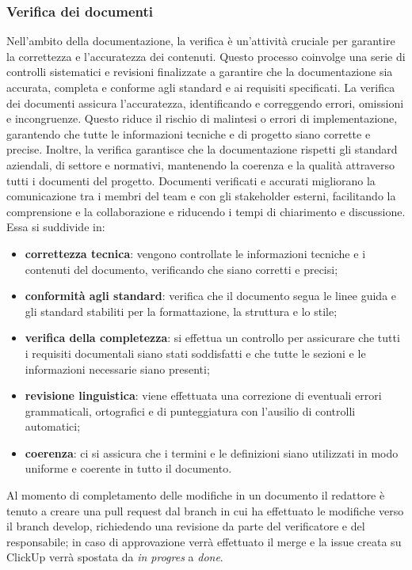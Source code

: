 \subsubsection{Verifica dei documenti} \label{verifica_dei_documenti}
Nell'ambito della documentazione, la verifica è un'attività cruciale per garantire la correttezza e l'accuratezza dei contenuti. Questo processo coinvolge una serie di controlli sistematici e revisioni finalizzate a garantire che la documentazione sia accurata, completa e conforme agli standard e ai requisiti specificati.
La verifica dei documenti assicura l'accuratezza, identificando e correggendo errori, omissioni e incongruenze. Questo riduce il rischio di malintesi o errori di implementazione, garantendo che tutte le informazioni tecniche e di progetto siano corrette e precise.
Inoltre, la verifica garantisce che la documentazione rispetti gli standard aziendali, di settore e normativi, mantenendo la coerenza e la qualità attraverso tutti i documenti del progetto. Documenti verificati e accurati migliorano la comunicazione tra i membri del team e con gli stakeholder esterni, facilitando la comprensione e la collaborazione e riducendo i tempi di chiarimento e discussione. Essa si suddivide in:
\begin{itemize}
	\item \textbf{correttezza tecnica}: vengono controllate le informazioni tecniche e i contenuti del documento, verificando che siano corretti e precisi;
	\item \textbf{conformità agli standard}: verifica che il documento segua le linee guida e gli standard stabiliti per la formattazione, la struttura e lo stile;
	\item \textbf{verifica della completezza}: si effettua un controllo per assicurare che tutti i requisiti documentali siano stati soddisfatti e che  tutte le sezioni e le informazioni necessarie siano presenti;
	\item \textbf{revisione linguistica}: viene effettuata una correzione di eventuali errori grammaticali, ortografici e di punteggiatura con l'ausilio di controlli automatici;
	\item \textbf{coerenza}: ci si assicura che i termini e le definizioni siano utilizzati in modo uniforme e coerente in tutto il documento.
\end{itemize}

Al momento di completamento delle modifiche in un documento il redattore è tenuto a creare una pull request dal branch in cui ha effettuato le modifiche verso il branch develop, richiedendo una revisione da parte del verificatore e del responsabile; in caso di approvazione verrà effettuato il merge e la issue creata su ClickUp verrà spostata da \textit{in progres} a \textit{done}.


